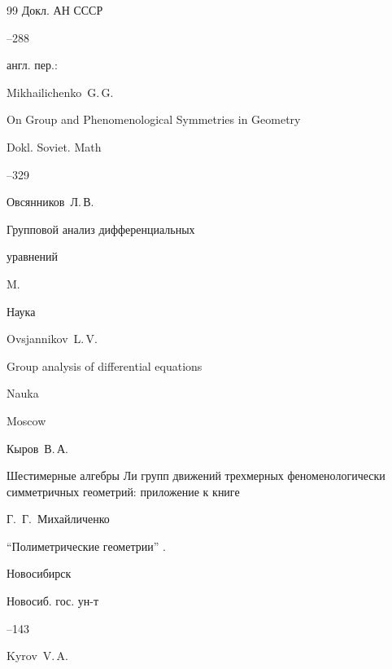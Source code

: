 \begin{thebibliography}{99}
\jour Докл. АН СССР




--288

\transl англ. пер.:~

\by Mikhailichenko~G.\,G.

\paper  On Group and Phenomenological Symmetries in Geometry 

\jour Dokl. Soviet. Math




--329






\by Овсянников~Л.\,В.

\book Групповой анализ дифференциальных

уравнений

\publaddr M.

\publ Наука



\misctransl

\by Ovsjannikov~L.\,V. 

\book Group analysis of differential equations

\publ Nauka

\publaddr Moscow






\by Кыров~В.\,А. \nofrills

\paperinfo  Шестимерные алгебры Ли групп движений трехмерных феноменологически симметричных геометрий: приложение к книге \nofrills

\byy Г.~Г.~Михайличенко \nofrills

\inbook  ``Полиметрические геометрии'' \nofrills.

\publaddr Новосибирск

\publ Новосиб. гос. ун-т


--143

\misctransl 

\by Kyrov~V.\,A. \nofrills


\end{thebibliography}
